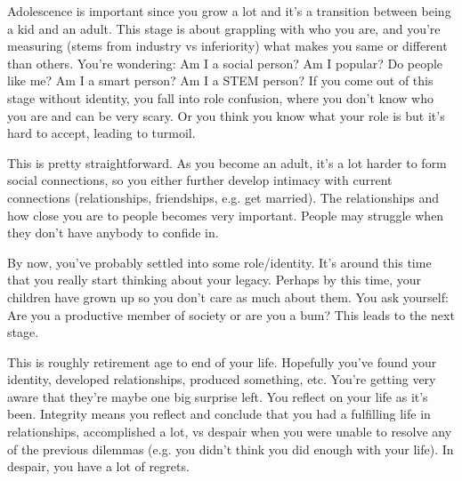 \documentclass{article}
\begin{document}
  \begin{definition}
    \label{def:13-to-21-years-identity-vs-role-confusion}
    Adolescence is important since you grow a lot and it's a transition between being a kid and an adult. This stage is about grappling with who you are, and you're measuring (stems from industry vs inferiority) what makes you same or different than others. You're wondering: Am I a social person? Am I popular? Do people like me? Am I a smart person? Am I a STEM person? If you come out of this stage without identity, you fall into role confusion, where you don't know who you are and can be very scary. Or you think you know what your role is but it's hard to accept, leading to turmoil. 
  \end{definition}

  \begin{definition}
    \label{def:21-to-39-years-intimacy-vs-isolation}
    This is pretty straightforward. As you become an adult, it's a lot harder to form social connections, so you either further develop intimacy with current connections (relationships, friendships, e.g. get married). The relationships and how close you are to people becomes very important. People may struggle when they don't have anybody to confide in. 
  \end{definition}

  \begin{definition}
    \label{def:40-to-65-years-generativity-vs-stagnation}
    By now, you've probably settled into some role/identity. It's around this time that you really start thinking about your legacy. Perhaps by this time, your children have grown up so you don't care as much about them. You ask yourself: Are you a productive member of society or are you a bum? This leads to the next stage. 
  \end{definition}

  \begin{definition}
    \label{def:65-years-integrity-vs-despair}
    This is roughly retirement age to end of your life. Hopefully you've found your identity, developed relationships, produced something, etc. You're getting very aware that they're maybe one big surprise left. You reflect on your life as it's been. Integrity means you reflect and conclude that you had a fulfilling life in relationships, accomplished a lot, vs despair when you were unable to resolve any of the previous dilemmas (e.g. you didn't think you did enough with your life). In despair, you have a lot of regrets. 
  \end{definition}
\end{document}
